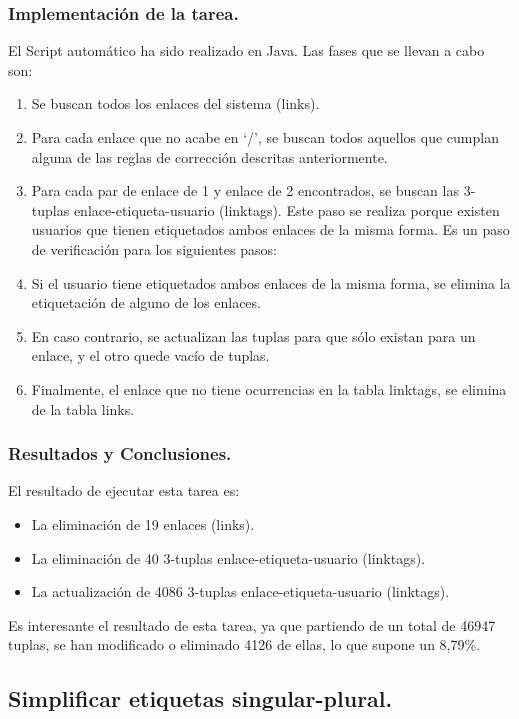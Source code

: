\subsubsection{Implementación de la tarea.}

El Script automático ha sido realizado en Java. Las fases que se llevan a cabo son:
\begin{enumerate}
\item    Se buscan todos los enlaces del sistema (links).
\item    Para cada enlace que no acabe en ‘/’, se buscan todos aquellos que cumplan alguna de las reglas de corrección descritas anteriormente.
\item    Para cada par de enlace de 1 y enlace de 2 encontrados, se buscan las 3-tuplas enlace-etiqueta-usuario (linktags). Este paso se realiza porque existen usuarios que tienen etiquetados ambos enlaces de la misma forma. Es un paso de verificación para los siguientes pasos:
\item    Si el usuario tiene etiquetados ambos enlaces de la misma forma, se elimina la etiquetación de alguno de los enlaces.
\item    En caso contrario, se actualizan las tuplas para que sólo existan para un enlace, y el otro quede vacío de tuplas.
\item    Finalmente, el enlace que no tiene ocurrencias en la tabla linktags, se elimina de la tabla links.
\end{enumerate}


\subsubsection{Resultados y Conclusiones.}

El resultado de ejecutar esta tarea es:
\begin{itemize}
\item    La eliminación de 19 enlaces (links).
\item    La eliminación de 40 3-tuplas enlace-etiqueta-usuario (linktags).
\item    La actualización de 4086 3-tuplas enlace-etiqueta-usuario (linktags).
\end{itemize}
Es interesante el resultado de esta tarea, ya que partiendo de un total de 46947 tuplas, se han modificado o eliminado 4126 de ellas, lo que supone un 8,79\%.


\subsection{Simplificar etiquetas singular-plural.}

